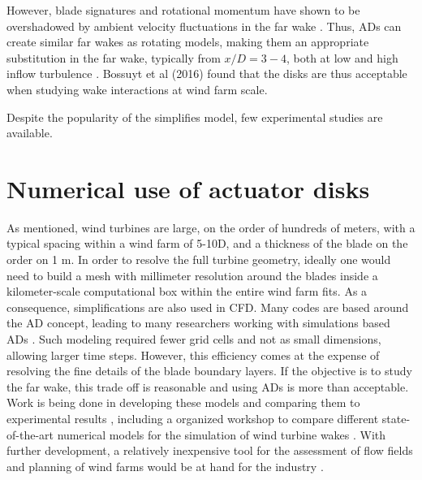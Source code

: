 However, blade signatures and rotational momentum have shown to be overshadowed by ambient velocity fluctuations in the far wake \cite{Aubrun2013}. Thus, \gls{AD}s can create similar far wakes as rotating models, making them an appropriate substitution in the far wake, typically from $x/D = 3-4$, both at low and high inflow turbulence \cite{Lignarolo2014} \cite{Aubrun2013} \cite{Neunaber} \cite{Aubrun2019} \cite{Lignarolo2016}. Bossuyt et al (2016) \cite{Bossuyt2016} found that the disks are thus acceptable when studying wake interactions at wind farm scale.  

Despite the popularity of the simplifies model, few experimental studies are available. 









\section{Numerical use of actuator disks}

As mentioned, wind turbines are large, on the order of hundreds of meters, with a typical spacing within a wind farm of 5-10D, and a thickness of the blade on the order on 1 \si{m}. In order to resolve the full turbine geometry, ideally one would need to build a mesh with millimeter resolution around the blades inside a kilometer-scale computational box within the entire wind farm fits. As a consequence, simplifications are also used in \gls{CFD}. Many codes are based around the \gls{AD} concept, leading to many researchers working with simulations based \gls{AD}s \cite{Harrison2010} \cite{Tossas2014} \cite{Lignarolo2016} \cite{Wu2011} \cite{Wu2012} \cite{Simisiroglou2017} \cite{Stevens2014} \cite{StevensAlso2014}. Such modeling required fewer grid cells and not as small dimensions, allowing larger time steps. However, this efficiency comes at the expense of resolving the fine details of the blade boundary layers. If the objective is to study the far wake, this trade off is reasonable and using \gls{AD}s is more than acceptable. Work is being done in developing these models and comparing them to experimental results \cite{Harrison2010} \cite{Tossas2014}, including a organized workshop to compare different state-of-the-art numerical models for the simulation of wind turbine wakes \cite{LignaroloWorkshop2016}. With further development, a relatively inexpensive tool for the assessment of flow fields and planning of wind farms would be at hand for the industry \cite{Harrison2010} \cite{Sforza1981}. 

